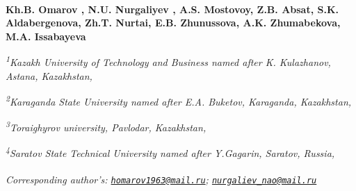 
\begin{articleheader}

{\bfseries Kh.B. Omarov\textsuperscript{\envelope } \authorid,
N.U. Nurgaliyev\textsuperscript{\envelope } \authorid,
A.S. Mostovoy\authorid,
Z.B. Absat\authorid,
S.K. Aldabergenova\authorid,
Zh.T. Nurtai\authorid,
E.B. Zhunussova\authorid,
A.K. Zhumabekova\authorid,
M.A. Issabayeva\authorid}
\end{articleheader}

\begin{affiliation}
\emph{\textsuperscript{1}Kazakh University of Technology and Business named after K. Kulazhanov, Astana, Kazakhstan,}

\emph{\textsuperscript{2}Karaganda State University named after E.A. Buketov, Karaganda, Kazakhstan,}

\emph{\textsuperscript{3}Toraighyrov university, Pavlodar, Kazakhstan,}

\emph{\textsuperscript{4}Saratov State Technical University named after Y.Gagarin, Saratov, Russia,}

\raggedright \textsuperscript{\envelope }{\em Corresponding author's: \href{mailto:homarov1963@mail.ru}{\nolinkurl{homarov1963@mail.ru}}; \href{mailto:nurgaliev_nao@mail.ru}{\nolinkurl{nurgaliev\_nao@mail.ru}}}
\end{affiliation}

